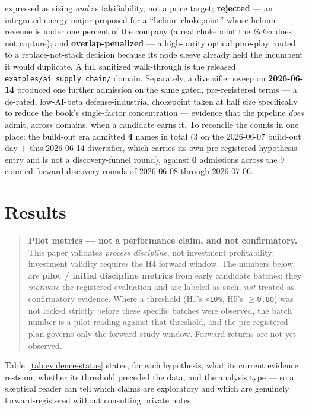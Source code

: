 \documentclass[11pt]{article}
\begin{document}
expressed as sizing \emph{and} as falsifiability, not a price target; \textbf{rejected} --- an integrated energy major
proposed for a ``helium chokepoint'' whose helium revenue is under one percent of the company (a real
chokepoint the \emph{ticker} does not capture); and \textbf{overlap-penalized} --- a high-purity
optical pure-play routed to a replace-not-stack decision because its node sleeve already held the
incumbent it would duplicate. A full sanitized walk-through is the released
\texttt{examples/ai\_supply\_chain/} domain. Separately, a diversifier sweep on \textbf{2026-06-14}
produced one further
admission on the same gated, pre-registered terms --- a de-rated, low-AI-beta defense-industrial
chokepoint taken at half size specifically to reduce the book's single-factor concentration --- evidence
that the pipeline \emph{does} admit, across domains, when a candidate earns it. To reconcile the
counts in one place: the build-out era admitted \textbf{4} names in total (3 on the 2026-06-07
build-out day $+$ this 2026-06-14 diversifier, which carries its own pre-registered hypothesis entry
and is not a discovery-funnel round), against \textbf{0} admissions across the 9 counted forward
discovery rounds of 2026-06-08 through 2026-07-06.

\section{Results}

\begin{quote}
\textbf{Pilot metrics --- not a performance claim, and not confirmatory.}
This paper validates \emph{process discipline}, not investment profitability;
investment validity requires the H4 forward window. The numbers below are
\textbf{pilot / initial discipline metrics} from early candidate batches: they
\emph{motivate} the registered evaluation and are labeled as such, \emph{not}
treated as confirmatory evidence. Where a threshold (H1's \texttt{<10\%}, H5's
\texttt{$\geq$0.80}) was not locked strictly before these specific batches were
observed, the batch number is a pilot reading against that threshold, and the
pre-registered plan governs only the forward study window. Forward returns are
not yet observed.
\end{quote}

Table~\ref{tab:evidence-status} states, for each hypothesis, what its current evidence rests on,
whether its threshold preceded the data, and the analysis type --- so a skeptical reader can tell
which claims are exploratory and which are genuinely forward-registered without consulting private
notes.
\end{document}
